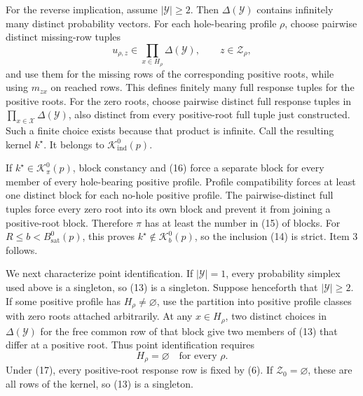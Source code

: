 For the reverse implication, assume \(|\mathcal Y|\geq2\).  Then
\(\Delta(\mathcal Y)\) contains infinitely many distinct probability
vectors.  For each hole-bearing profile \(\rho\), choose pairwise
distinct missing-row tuples
\[
 u_{\rho,z}\in
 \prod_{x\in H_\rho}\Delta(\mathcal Y),
 \qquad z\in\mathcal Z_\rho,
\tag{16}
\]
and use them for the missing rows of the corresponding positive roots,
while using \(m_{zx}\) on reached rows.  This defines finitely many full
response tuples for the positive roots.  For the zero roots, choose
pairwise distinct full response tuples in
\(\prod_{x\in\mathcal X}\Delta(\mathcal Y)\), also distinct from every
positive-root full tuple just constructed.  Such a finite choice exists
because that product is infinite.  Call the resulting kernel \(k^\star\).
It belongs to \(\mathcal K_{\mathrm{ind}}^0(p)\).

If \(k^\star\in\mathcal K_\pi^0(p)\), block constancy and (16) force a
separate block for every member of every hole-bearing positive profile.
Profile compatibility forces at least one distinct block for each
no-hole positive profile.  The pairwise-distinct full tuples force every
zero root into its own block and prevent it from joining a positive-root
block.  Therefore \(\pi\) has at least the number in (15) of blocks.
For \(R\leq b<B_{\mathrm{sat}}^0(p)\), this proves
\(k^\star\notin\mathcal K_b^0(p)\), so the inclusion (14) is strict.
Item 3 follows.

We next characterize point identification.  If
\(|\mathcal Y|=1\), every probability simplex used above is a singleton,
so (13) is a singleton.  Suppose henceforth that
\(|\mathcal Y|\geq2\).  If some positive profile has
\(H_\rho\ne\varnothing\), use the partition into positive profile
classes with zero roots attached arbitrarily.  At any
\(x\in H_\rho\), two distinct choices in \(\Delta(\mathcal Y)\) for the
free common row of that block give two members of (13) that differ at a
positive root.  Thus point identification requires
\[
 H_\rho=\varnothing\quad\text{for every }\rho.
\tag{17}
\]
Under (17), every positive-root response row is fixed by (6).  If
\(\mathcal Z_0=\varnothing\), these are all rows of the kernel, so (13)
is a singleton.


